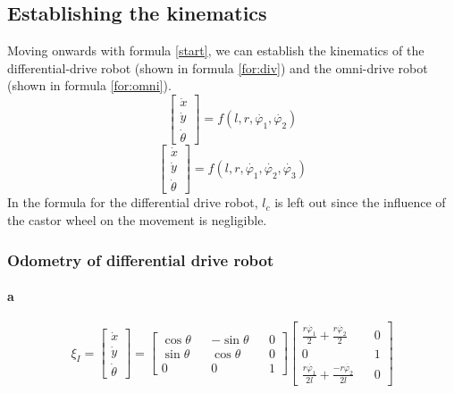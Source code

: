 \documentclass[12pt]{article}
\begin{document}
\subsection{Establishing the kinematics}
Moving onwards with formula \ref{start}, we can establish the kinematics of the differential-drive robot (shown in formula \ref{for:div}) and the omni-drive robot (shown in formula \ref{for:omni}).
\begin{equation}
    \begin{bmatrix} 
        \dot{x} \\ 
        \dot{y} \\ 
        \dot{\theta}
    \end{bmatrix} 
    = f(l, r, \dot{\varphi_1}, \dot{\varphi_2})
    \label{for:div}
\end{equation} 
\begin{equation}
    \begin{bmatrix} 
        \dot{x} \\ 
        \dot{y} \\ 
        \dot{\theta}
    \end{bmatrix} 
    = f(l, r, \dot{\varphi_1}, \dot{\varphi_2}, \dot{\varphi_3})
    \label{for:omni}
\end{equation} 
In the formula for the differential drive robot, $l_c$ is left out since the influence of the castor wheel on the movement is negligible.
\subsubsection{Odometry of differential drive robot}
\paragraph{a} \begin{equation}
\xi_I = 
\begin{bmatrix} \dot{x} \\ \dot{y} \\ \dot{\theta} \end{bmatrix}
= 
\begin{bmatrix} \cos \theta && - \sin \theta && 0 \\
\sin \theta && \cos \theta && 0 \\
0 && 0 && 1 \end{bmatrix} 
\begin{bmatrix} \frac{r\dot{\varphi_1}}{2} + \frac{r\dot{\varphi_2}}{2} && 0 \\ 0 && 1 \\ \frac{r\dot{\varphi_1}}{2l} + \frac{-r\dot{\varphi_2}}{2l} && 0\end{bmatrix}
\end{equation}
\end{document}
